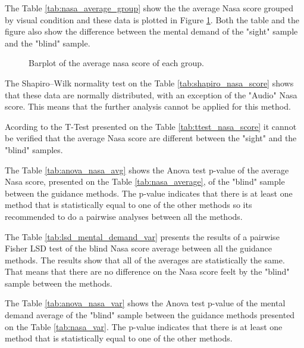 The Table \ref{tab:nasa_average_group} show the the average Nasa score grouped by visual condition and these data is plotted in Figure \ref{fig:barplot_nasa_global}. Both the table and the figure also show the difference between the mental demand of the "sight" sample and the "blind" sample.



\begin{figure}[!htb]
    \centering
    \resizebox{0.6\linewidth}{!}{
    
    }
    \caption{Barplot of the average nasa score of each group.}
    \label{fig:barplot_nasa_global}
\end{figure}

The Shapiro–Wilk normality test on the Table \ref{tab:shapiro_nasa_score} shows that these data are normally distributed, with an exception of the "Audio" Nasa score. This means that the further analysis cannot be applied for this method.



Acording to the T-Test presented on the Table \ref{tab:ttest_nasa_score} it cannot be verified that the average Nasa score are different between the "sight" and the "blind" samples.



The Table \ref{tab:anova_nasa_avg} shows the Anova test p-value of the average Nasa score, presented on the Table \ref{tab:nasa_average}, of the "blind" sample between the guidance methods. The p-value indicates that there is at least one method that is statistically equal to one of the other methods so its recommended to do a pairwise analyses between all the methods.



The Table \ref{tab:lsd_mental_demand_var} presents the results of a pairwise Fisher LSD test of the blind Nasa score average between all the guidance methods. The results show that all of the averages are statistically the same. That means that there are no difference on the Nasa score feelt by the "blind" sample between the methods.



The Table \ref{tab:anova_nasa_var} shows the Anova test p-value of the mental demand average of the "blind" sample between the guidance methods presented on the Table \ref{tab:nasa_var}. The p-value indicates that there is at least one method that is statistically equal to one of the other methods.

